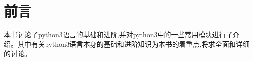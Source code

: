 \documentclass[12pt,oneside]{book}
\begin{document}
\frontmatter

\author{万泽}
\titleLB

\chapter*{前言}
\begin{common-format}
本书讨论了python3语言的基础和进阶,并对python3中的一些常用模块进行了介绍。其中有关python3语言本身的基础和进阶知识为本书的着重点,将求全面和详细的讨论。



\end{common-format}


\setcounter{tocdepth}{2}
\tableofcontents
\end{document}
